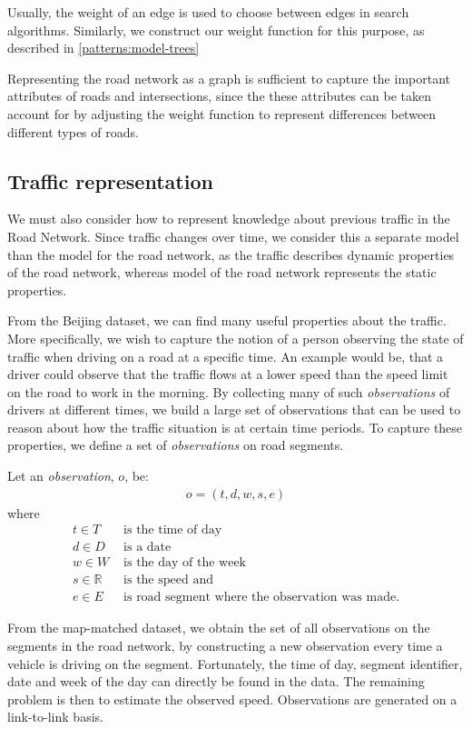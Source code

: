 Usually, the weight of an edge is used to choose between edges in search algorithms. Similarly, we construct our weight function for this purpose, as described in \ref{patterns:model-trees} 

Representing the road network as a graph is sufficient to capture the important attributes of roads and intersections, since the these attributes can be taken account for by adjusting the weight function to represent differences between different types of roads.

\subsection{Traffic representation}\label{KR:traffic}
We must also consider how to represent knowledge about previous traffic in the Road Network. Since traffic changes over time, we consider this a separate model than the model for the road network, as the traffic describes dynamic properties of the road network, whereas model of the road network represents the static properties.

From the Beijing dataset, we can find many useful properties about the traffic. More specifically, we wish to capture the notion of a person observing the state of traffic when driving on a road at a specific time. An example would be, that a driver could observe that the traffic flows at a lower speed than the speed limit on the road to work in the morning. By collecting many of such \emph{observations} of drivers at different times, we build a large set of observations that can be used to reason about how the traffic situation is at certain time periods. To capture these properties, we define a set of \emph{observations} on road segments.

Let an \emph{observation}, $o$, be:
\begin{align*}
o = (t, d, w, s, e)
\end{align*}
where
\begin{align*}
t \in T &\text{ is the time of day} \\
d \in D &\text{ is a date} \\
w \in W &\text{ is the day of the week} \\
s \in \mathbb{R} &\text{ is the speed and}\\
e \in E &\text{ is road segment where the observation was made.}
\end{align*}

From the map-matched dataset, we obtain the set of all observations on the segments in the road network, by constructing a new observation every time a vehicle is driving on the segment. Fortunately, the time of day, segment identifier, date and week of the day can directly be found in the data. The remaining problem is then to estimate the observed speed. Observations are generated on a link-to-link basis.

